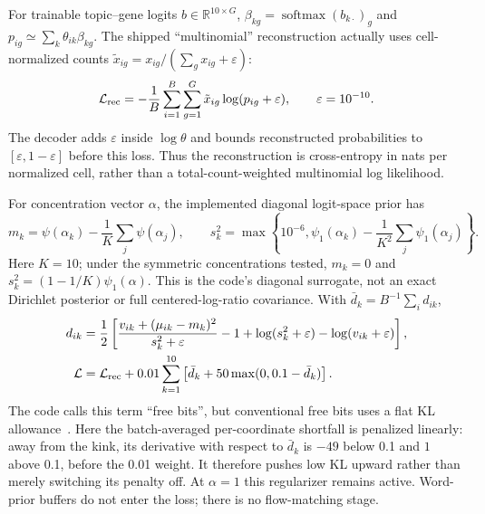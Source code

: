 \documentclass[11pt]{article}
\begin{document}
For trainable topic--gene logits $b\in\mathbb R^{10\times G}$, $\beta_{kg}=\operatorname{softmax}(b_{k\cdot})_g$ and $p_{ig}\simeq\sum_k\theta_{ik}\beta_{kg}$. The shipped ``multinomial'' reconstruction actually uses cell-normalized counts $\tilde x_{ig}=x_{ig}/(\sum_gx_{ig}+\varepsilon)$:
\begin{equation}
 \mathcal L_{\rm rec}=-\frac1B\sum_{i=1}^B\sum_{g=1}^G
 \tilde x_{ig}\log(p_{ig}+\varepsilon),\qquad \varepsilon=10^{-10}.
\end{equation}
The decoder adds $\varepsilon$ inside $\log\theta$ and bounds reconstructed probabilities to $[\varepsilon,1-\varepsilon]$ before this loss. Thus the reconstruction is cross-entropy in nats per normalized cell, rather than a total-count-weighted multinomial log likelihood.

For concentration vector $\alpha$, the implemented diagonal logit-space prior has
\begin{equation}
 m_k=\psi(\alpha_k)-\frac1K\sum_j\psi(\alpha_j),\qquad
 s_k^2=\max\left\{10^{-6},\psi_1(\alpha_k)-\frac1{K^2}\sum_j\psi_1(\alpha_j)\right\}.
\end{equation}
Here $K=10$; under the symmetric concentrations tested, $m_k=0$ and $s_k^2=(1-1/K)\psi_1(\alpha)$. This is the code's diagonal surrogate, not an exact Dirichlet posterior or full centered-log-ratio covariance. With $\bar d_k=B^{-1}\sum_i d_{ik}$,
\begin{align}
 d_{ik}&=\frac12\left[\frac{v_{ik}+(\mu_{ik}-m_k)^2}{s_k^2+\varepsilon}-1
       +\log(s_k^2+\varepsilon)-\log(v_{ik}+\varepsilon)\right],\\
 \mathcal L&=\mathcal L_{\rm rec}+0.01\sum_{k=1}^{10}
       \left[\bar d_k+50\max(0,0.1-\bar d_k)\right].\label{eq:topic-objective}
\end{align}
The code calls this term ``free bits'', but conventional free bits uses a flat KL allowance~\cite{kingma2016iaf}. Here the batch-averaged per-coordinate shortfall is penalized linearly: away from the kink, its derivative with respect to $\bar d_k$ is $-49$ below 0.1 and $1$ above 0.1, before the 0.01 weight. It therefore pushes low KL upward rather than merely switching its penalty off. At $\alpha=1$ this regularizer remains active. Word-prior buffers do not enter the loss; there is no flow-matching stage.
\end{document}

